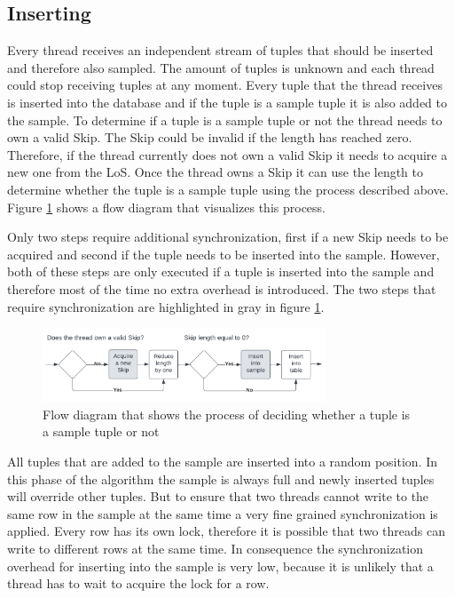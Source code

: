 \documentclass[sigconf,nonacm]{acmart}
\begin{document}
    \subsection{Inserting}
        Every thread receives an independent stream of tuples that should be inserted and therefore also sampled. The amount of tuples is unknown and each thread could stop receiving tuples at any moment. Every tuple  that the thread receives is inserted into the database and if the tuple is a sample tuple it is also added to the sample. To determine if a tuple is a sample tuple or not the thread needs to own a valid Skip. The Skip could be invalid if the length has reached zero. Therefore, if the thread currently does not own a valid Skip it needs to acquire a new one from the LoS. Once the thread owns a Skip it can use the length to determine whether the tuple is a sample tuple using the process described above. Figure \ref{fig:inserting} shows a flow diagram that visualizes this process.

        Only two steps require additional synchronization, first if a new Skip needs to be acquired and second if the tuple needs to be inserted into the sample. However, both of these steps are only executed if a tuple is inserted into the sample and therefore most of the time no extra overhead is introduced. The two steps that require synchronization are highlighted in gray in figure \ref{fig:inserting}.
        \begin{figure}[H]
            \includegraphics[height=2.2cm]{figure3.pdf}
            \caption{Flow diagram that shows the process of deciding whether a tuple is a sample tuple or not}
            \label{fig:inserting}
        \end{figure}        

        All tuples that are added to the sample are inserted into a random position. In this phase of the algorithm the sample is always full and newly inserted tuples will override other tuples. But to ensure that two threads cannot write to the same row in the sample at the same time a very fine grained synchronization is applied. Every row has its own lock, therefore it is possible that two threads can write to different rows at the same time. In consequence the synchronization overhead for inserting into the sample is very low, because it is unlikely that a thread has to wait to acquire the lock for a row. 
\end{document}

